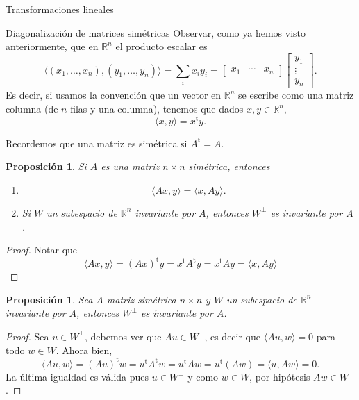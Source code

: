 \documentclass[a4paper,12pt,twoside,spanish,reqno]{amsbook}
\numberwithin{equation}{section}
\newtheorem{proposicion}[teorema]{Proposici\'on}
\theoremstyle{definition}
\theoremstyle{remark}
\newcommand{\la}{\langle}
\newcommand{\ra}{\rangle}
\renewcommand{\t}{{\operatorname{t}}}
\newcommand{\R}{\mathbb R}
\begin{document}
\begin{chapter}{Transformaciones lineales}
\begin{section}{Diagonalización de matrices simétricas}
    Observar, como ya hemos visto anteriormente,  que en $\R^n$ el producto escalar es 
    \begin{equation*}
        \la (x_1,\ldots,x_n),(y_1,\ldots,y_n)  \ra = \sum_i x_iy_i = \begin{bmatrix} x_1& \cdots &x_n\end{bmatrix}\begin{bmatrix} y_1 \\ \vdots \\ y_n \end{bmatrix}.
    \end{equation*}
    Es decir, si usamos la convención que un vector en $\R^n$  se escribe como una matriz columna (de $n$ filas y una columna),  tenemos que dados $x,y \in \R^n$, 
    \begin{equation*}
        \la x,y \ra = x^\t y.
    \end{equation*}
    
    Recordemos que una matriz es simétrica si $A^\t =A$. 
    
\begin{proposicion}
    Si $A$ es una matriz $n \times n$ simétrica, entonces 
    \begin{enumerate}[label=\emph{\alph*})]
        \item 
        \begin{equation*}
        \la Ax,y \ra =  \la x,Ay \ra .
        \end{equation*}
        \item Si $W$ un subespacio de $\R^n$ invariante por $A$, entonces $W^\perp$ es invariante por $A$.
    \end{enumerate}
\end{proposicion}
\begin{proof}
    Notar que
    \begin{equation*}
    \la Ax,y \ra = (Ax)^\t y = x^\t A^\t y  = x^\t A y = \la x,Ay \ra 
    \end{equation*}
\end{proof}
    
    
    
    \begin{proposicion}\label{wperpinv}
        Sea $A$ matriz simétrica $n \times n$ y $W$ un subespacio de $\R^n$ invariante por $A$, entonces $W^\perp$ es invariante por $A$.
    \end{proposicion}
    \begin{proof}
        Sea $u \in W^\perp$,  debemos ver que $Au \in W^\perp$,  es decir que $\la Au,w\ra =0$ para todo $w \in W$. Ahora bien,
        \begin{equation*}
            \la Au,w\ra =(Au)^\t w = u^\t A^\t w =u^\t A w = u^\t (A w) = \la u, Aw\ra=0.  
        \end{equation*}
        La última igualdad es válida pues $u \in W^\perp$ y  como $w \in W$, por hipótesis $Aw \in W$.
    \end{proof}
    

\end{section}
\end{chapter}
\end{document}

